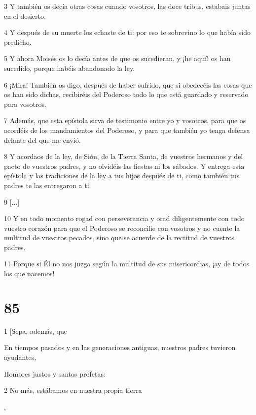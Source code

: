 \par 3 Y también os decía otras cosas cuando vosotros, las doce tribus, estabais juntas en el desierto.

\par 4 Y después de su muerte los echaste de ti: por eso te sobrevino lo que había sido predicho.

\par 5 Y ahora Moisés os lo decía antes de que os sucedieran, y ¡he aquí! os han sucedido, porque habéis abandonado la ley.

\par 6 ¡Mira! También os digo, después de haber sufrido, que si obedecéis las cosas que os han sido dichas, recibiréis del Poderoso todo lo que está guardado y reservado para vosotros.

\par 7 Además, que esta epístola sirva de testimonio entre yo y vosotros, para que os acordéis de los mandamientos del Poderoso, y para que también yo tenga defensa delante del que me envió.

\par 8 Y acordaos de la ley, de Sión, de la Tierra Santa, de vuestros hermanos y del pacto de vuestros padres, y no olvidéis las fiestas ni los sábados. Y entrega esta epístola y las tradiciones de la ley a tus hijos después de ti, como también tus padres te las entregaron a ti.

\par 9 [...]

\par 10 Y en todo momento rogad con perseverancia y orad diligentemente con todo vuestro corazón para que el Poderoso se reconcilie con vosotros y no cuente la multitud de vuestros pecados, sino que se acuerde de la rectitud de vuestros padres.

\par 11 Porque si Él no nos juzga según la multitud de sus misericordias, ¡ay de todos los que nacemos!

\chapter{85}

\par 1 [Sepa, además, que

\par En tiempos pasados ​​y en las generaciones antiguas, nuestros padres tuvieron ayudantes,

\par Hombres justos y santos profetas:

\par 2 No más, estábamos en nuestra propia tierra

\par [Y nos ayudaron cuando pecamos],

